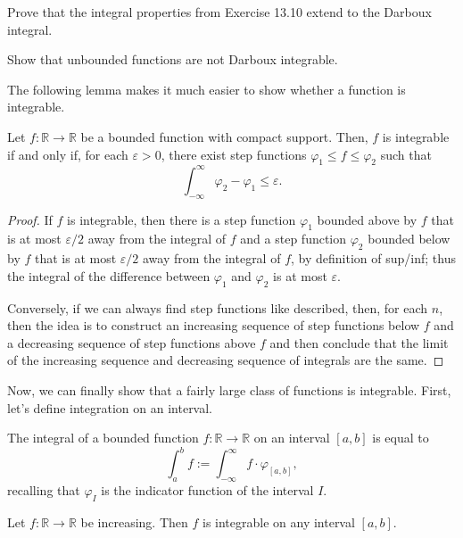 \documentclass[10pt]{scrartcl}
\providecommand{\eps}{\varepsilon}
\providecommand{\RR}{\mathbb R}
\begin{document}
\begin{exercise}
	Prove that the integral properties from Exercise 13.10
	extend to the Darboux integral.
\end{exercise}

\begin{exercise}
	Show that unbounded functions are not Darboux integrable.
\end{exercise}

\pagebreak
The following lemma makes it much easier to show
whether a function is integrable.
\begin{lemma}\label{wk13:integrability-criterion}
	Let $f\colon\RR\to\RR$ be a bounded function with compact support.
	Then, $f$ is integrable if and only if, for each $\eps > 0$,
	there exist step functions
	$\varphi_1 \le f \le \varphi_2$ such that
	\[\int_{-\infty}^\infty \varphi_2 - \varphi_1 \le \eps.\]
\end{lemma}

\begin{proof}
	If $f$ is integrable, then there is a step function $\varphi_1$
	bounded above by $f$ that is at most $\eps/2$ away from the integral of $f$
	and a step function $\varphi_2$ bounded below by $f$
	that is at most $\eps/2$ away from the integral of $f$,
	by definition of sup/inf;
	thus the integral of the difference between $\varphi_1$ and $\varphi_2$
	is at most $\eps$.
	
	Conversely, if we can always find step functions like described,
	then, for each $n$, then the idea is to construct
	an increasing sequence of step functions below $f$
	and a decreasing sequence of step functions above $f$
	and then conclude that the limit of the increasing sequence
	and decreasing sequence of integrals are the same.
\end{proof}

Now, we can finally show that a fairly large class of functions is integrable.
First, let's define integration on an interval.
\begin{definition}
	The integral of a bounded function $f\colon\RR\to\RR$
	on an interval $[a,b]$ is equal to
	\[\int_a^b f := \int_{-\infty}^\infty f\cdot \varphi_{[a,b]},\]
	recalling that $\varphi_I$ is the indicator function of the interval $I$.
\end{definition}

\begin{theorem}
	Let $f\colon\RR\to\RR$ be increasing. Then $f$
	is integrable on any interval $[a,b]$.
\end{theorem}
\end{document}
